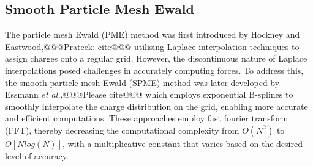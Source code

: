 \subsection{Smooth Particle Mesh Ewald}
The particle mesh Ewald (PME) method was first introduced by Hockney and Eastwood,@@@Prateek: cite@@@ utilising Laplace interpolation techniques to assign charges onto a regular grid. However, the discontinuous nature of Laplace interpolations posed challenges in accurately computing forces. To address this, the smooth particle mesh Ewald (SPME) method was later developed by Essmann \textit{et al.},@@@Please cite@@@ which employs exponential B-splines to smoothly interpolate the charge distribution on the grid, enabling more accurate and efficient computations. These approaches employ fast fourier transform (FFT), thereby decreasing the computational complexity from $O(N^2)$ to $O[Nlog(N)]$, with a multiplicative constant that varies based on the desired level of accuracy.

